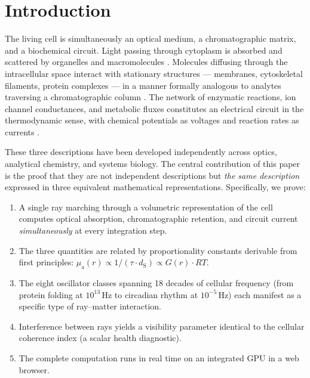 \documentclass[11pt,twocolumn,a4paper]{article}
\newcommand{\dS}{d_{\mathrm{S}}}
\newcommand{\muabs}{\mu_{\mathrm{a}}}
\begin{document}

\section{Introduction}
\label{sec:introduction}

The living cell is simultaneously an optical medium, a chromatographic
matrix, and a biochemical circuit. Light passing through cytoplasm is
absorbed and scattered by organelles and macromolecules
\citep{bornwolf1999}. Molecules diffusing through the intracellular
space interact with stationary structures --- membranes, cytoskeletal
filaments, protein complexes --- in a manner formally analogous to
analytes traversing a chromatographic column
\citep{martinsynge1941,vandeemter1956}. The network of enzymatic
reactions, ion channel conductances, and metabolic fluxes constitutes
an electrical circuit in the thermodynamic sense, with chemical
potentials as voltages and reaction rates as currents
\citep{kirchhoff1847,onsager1931}.

These three descriptions have been developed independently across
optics, analytical chemistry, and systems biology. The central
contribution of this paper is the proof that they are not independent
descriptions but \emph{the same description} expressed in three
equivalent mathematical representations. Specifically, we prove:

\begin{enumerate}[leftmargin=*,itemsep=2pt]
\item A single ray marching through a volumetric representation of the
  cell computes optical absorption, chromatographic retention, and
  circuit current \emph{simultaneously} at every integration step.

\item The three quantities are related by proportionality constants
  derivable from first principles: $\muabs(r) \propto 1/(\tau \cdot
  \dS) \propto G(r) \cdot RT$.

\item The eight oscillator classes spanning 18 decades of cellular
  frequency (from protein folding at $10^{13}$\,Hz to circadian
  rhythm at $10^{-5}$\,Hz) each manifest as a specific type of
  ray--matter interaction.

\item Interference between rays yields a visibility parameter
  identical to the cellular coherence index (a scalar health
  diagnostic).

\item The complete computation runs in real time on an integrated GPU
  in a web browser.
\end{enumerate}
\end{document}
